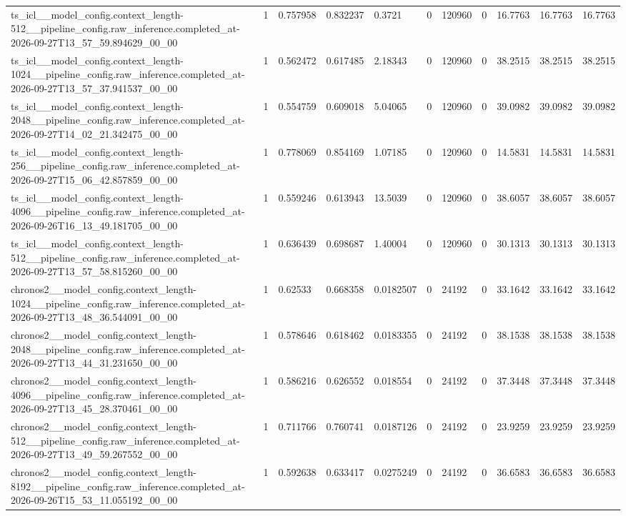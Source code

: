 \begin{tabular}{lllllllllll}
ts\_icl\_\_model\_config.context\_length-512\_\_pipeline\_config.raw\_inference.completed\_at-2026-09-27T13\_57\_59.894629\_00\_00 & 1 & 0.757958 & 0.832237 & 0.3721 & 0 & 120960 & 0 & 16.7763 & 16.7763 & 16.7763 \\
ts\_icl\_\_model\_config.context\_length-1024\_\_pipeline\_config.raw\_inference.completed\_at-2026-09-27T13\_57\_37.941537\_00\_00 & 1 & 0.562472 & 0.617485 & 2.18343 & 0 & 120960 & 0 & 38.2515 & 38.2515 & 38.2515 \\
ts\_icl\_\_model\_config.context\_length-2048\_\_pipeline\_config.raw\_inference.completed\_at-2026-09-27T14\_02\_21.342475\_00\_00 & 1 & 0.554759 & 0.609018 & 5.04065 & 0 & 120960 & 0 & 39.0982 & 39.0982 & 39.0982 \\
ts\_icl\_\_model\_config.context\_length-256\_\_pipeline\_config.raw\_inference.completed\_at-2026-09-27T15\_06\_42.857859\_00\_00 & 1 & 0.778069 & 0.854169 & 1.07185 & 0 & 120960 & 0 & 14.5831 & 14.5831 & 14.5831 \\
ts\_icl\_\_model\_config.context\_length-4096\_\_pipeline\_config.raw\_inference.completed\_at-2026-09-26T16\_13\_49.181705\_00\_00 & 1 & 0.559246 & 0.613943 & 13.5039 & 0 & 120960 & 0 & 38.6057 & 38.6057 & 38.6057 \\
ts\_icl\_\_model\_config.context\_length-512\_\_pipeline\_config.raw\_inference.completed\_at-2026-09-27T13\_57\_58.815260\_00\_00 & 1 & 0.636439 & 0.698687 & 1.40004 & 0 & 120960 & 0 & 30.1313 & 30.1313 & 30.1313 \\
chronos2\_\_model\_config.context\_length-1024\_\_pipeline\_config.raw\_inference.completed\_at-2026-09-27T13\_48\_36.544091\_00\_00 & 1 & 0.62533 & 0.668358 & 0.0182507 & 0 & 24192 & 0 & 33.1642 & 33.1642 & 33.1642 \\
chronos2\_\_model\_config.context\_length-2048\_\_pipeline\_config.raw\_inference.completed\_at-2026-09-27T13\_44\_31.231650\_00\_00 & 1 & 0.578646 & 0.618462 & 0.0183355 & 0 & 24192 & 0 & 38.1538 & 38.1538 & 38.1538 \\
chronos2\_\_model\_config.context\_length-4096\_\_pipeline\_config.raw\_inference.completed\_at-2026-09-27T13\_45\_28.370461\_00\_00 & 1 & 0.586216 & 0.626552 & 0.018554 & 0 & 24192 & 0 & 37.3448 & 37.3448 & 37.3448 \\
chronos2\_\_model\_config.context\_length-512\_\_pipeline\_config.raw\_inference.completed\_at-2026-09-27T13\_49\_59.267552\_00\_00 & 1 & 0.711766 & 0.760741 & 0.0187126 & 0 & 24192 & 0 & 23.9259 & 23.9259 & 23.9259 \\
chronos2\_\_model\_config.context\_length-8192\_\_pipeline\_config.raw\_inference.completed\_at-2026-09-26T15\_53\_11.055192\_00\_00 & 1 & 0.592638 & 0.633417 & 0.0275249 & 0 & 24192 & 0 & 36.6583 & 36.6583 & 36.6583 \\

\end{tabular}

